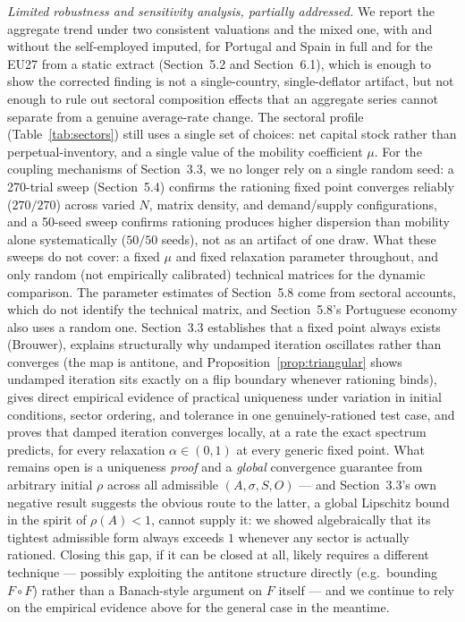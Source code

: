 \documentclass[11pt]{article}
\begin{document}
\emph{Limited robustness and sensitivity analysis, partially addressed.}
We report the aggregate trend under two consistent valuations and the
mixed one, with and without the self-employed imputed, for Portugal and
Spain in full and for the EU27 from a static extract (Section~5.2 and
Section~6.1), which is enough to show the corrected finding is not a
single-country, single-deflator artifact, but not enough to rule out
sectoral composition effects
that an aggregate series cannot separate from a genuine average-rate
change. The sectoral profile (Table~\ref{tab:sectors}) still uses a
single set of choices: net capital stock rather than perpetual-inventory,
and a single value of the mobility coefficient $\mu$. For the coupling
mechanisms of Section~3.3, we no longer rely on a single random seed: a
270-trial sweep (Section~5.4) confirms the rationing fixed point
converges reliably ($270/270$) across varied $N$, matrix density, and
demand/supply configurations, and a 50-seed sweep confirms rationing
produces higher dispersion than mobility alone systematically
($50/50$ seeds), not as an artifact of one draw. What these sweeps do
not cover: a fixed $\mu$ and fixed relaxation parameter throughout, and
only random (not empirically calibrated) technical matrices for the
dynamic comparison. The parameter estimates of Section~5.8 come from
sectoral accounts, which do not identify the technical matrix, and
Section~5.8's Portuguese economy also uses a random one. Section~3.3
establishes that a fixed point always exists (Brouwer), explains
structurally why undamped iteration oscillates rather than converges
(the map is antitone, and Proposition~\ref{prop:triangular} shows
undamped iteration sits exactly on a flip boundary whenever rationing
binds), gives direct empirical evidence of practical
uniqueness under variation in initial conditions, sector ordering, and
tolerance in one genuinely-rationed test case, and proves that damped
iteration converges locally, at a rate the exact spectrum predicts, for
every relaxation $\alpha\in(0,1)$ at every generic fixed point. What
remains open is a uniqueness \emph{proof} and a \emph{global}
convergence guarantee from arbitrary initial $\rho$ across all
admissible $(A,\sigma,S,O)$ --- and Section~3.3's
own negative result suggests the obvious route to the latter, a global
Lipschitz bound in the spirit of $\rho(A)<1$, cannot supply it: we
showed algebraically that its tightest admissible form always exceeds
$1$ whenever any sector is actually rationed. Closing this gap, if it
can be closed at all, likely requires a different technique --- possibly
exploiting the antitone structure directly (e.g.\ bounding $F\circ F$)
rather than a Banach-style argument on $F$ itself --- and we continue to
rely on the empirical evidence above for the general case in the
meantime.
\end{document}
